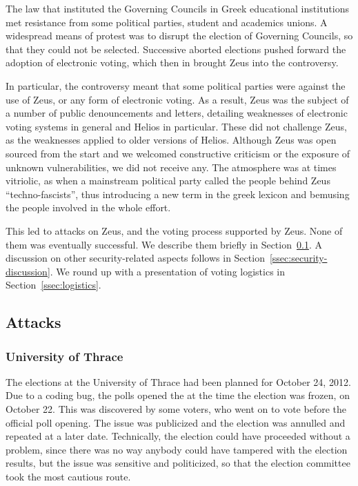 \documentclass[letterpaper,10pt]{article}
\begin{document}
The law that instituted the Governing Councils in Greek educational
institutions met resistance from some political parties, student and
academics unions. A widespread means of protest was to disrupt the
election of Governing Councils, so that they could not be selected.
Successive aborted elections pushed forward the adoption of electronic
voting, which then in brought Zeus into the controversy. 

In particular, the controversy meant that some political parties were
against the use of Zeus, or any form of electronic voting. As a
result, Zeus was the subject of a number of public denouncements and
letters, detailing weaknesses of electronic voting systems in general
and Helios in particular. These did not challenge Zeus, as the
weaknesses applied to older versions of Helios. Although Zeus was open
sourced from the start and we welcomed constructive criticism or the
exposure of unknown vulnerabilities, we did not receive any. The
atmosphere was at times vitriolic, as when a mainstream political
party called the people behind Zeus ``techno-fascists'', thus
introducing a new term in the greek lexicon and bemusing the people
involved in the whole effort.

This led to attacks on Zeus, and the voting process supported by Zeus.
None of them was eventually successful. We describe them briefly in
Section~\ref{ssec:attacks}. A discussion on other security-related
aspects follows in Section~\ref{ssec:security-discussion}. We round up
with a presentation of voting logistics in
Section~\ref{ssec:logistics}.

\subsection{Attacks}
\label{ssec:attacks}

\subsubsection{University of Thrace}
\label{sssec:thrace}

The elections at the University of Thrace had been planned for October
24, 2012. Due to a coding bug, the polls opened the at the time the
election was frozen, on October 22. This was discovered by some
voters, who went on to vote before the official poll opening. The
issue was publicized and the election was annulled and repeated at a
later date. Technically, the election could have proceeded without a
problem, since there was no way anybody could have tampered with the
election results, but the issue was sensitive and politicized, so that
the election committee took the most cautious route.
\end{document}
